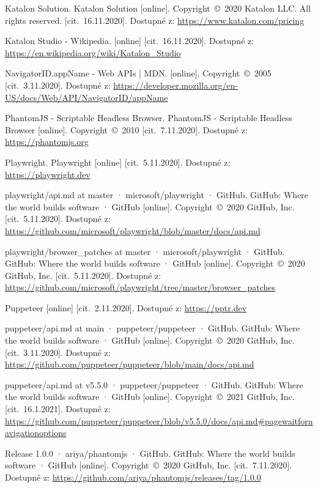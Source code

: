 \begin{thebibliography}{99}
 Katalon Solution. Katalon Solution [online]. Copyright~©~2020 Katalon LLC. All rights reserved. [cit.~16.11.2020]. Dostupné z: \url{https://www.katalon.com/pricing}

 Katalon Studio - Wikipedia. [online] [cit.~16.11.2020]. Dostupné z: \url{https://en.wikipedia.org/wiki/Katalon_Studio}

 NavigatorID.appName - Web APIs | MDN. [online]. Copyright~©~2005 [cit.~3.11.2020]. Dostupné z: \url{https://developer.mozilla.org/en-US/docs/Web/API/NavigatorID/appName}

 PhantomJS - Scriptable Headless Browser. PhantomJS - Scriptable Headless Browser [online]. Copyright~©~2010 [cit.~7.11.2020]. Dostupné z: \url{https://phantomjs.org}

 Playwright. Playwright [online] [cit.~5.11.2020]. Dostupné z: \url{https://playwright.dev}

 playwright/api.md at master · microsoft/playwright · GitHub. GitHub: Where the world builds software · GitHub [online]. Copyright~©~2020 GitHub, Inc. [cit.~5.11.2020]. Dostupné z: \url{https://github.com/microsoft/playwright/blob/master/docs/api.md}

 playwright/browser\_patches at master · microsoft/playwright · GitHub. GitHub: Where the world builds software · GitHub [online]. Copyright~©~2020 GitHub, Inc. [cit.~5.11.2020]. Dostupné z: \url{https://github.com/microsoft/playwright/tree/master/browser_patches}

 Puppeteer [online] [cit.~2.11.2020]. Dostupné z: \url{https://pptr.dev}

 puppeteer/api.md at main · puppeteer/puppeteer · GitHub. GitHub: Where the world builds software · GitHub [online]. Copyright~©~2020 GitHub, Inc. [cit.~3.11.2020]. Dostupné z: \url{https://github.com/puppeteer/puppeteer/blob/main/docs/api.md}

 puppeteer/api.md at v5.5.0 · puppeteer/puppeteer · GitHub. GitHub: Where the world builds software · GitHub [online]. Copyright~©~2021 GitHub, Inc. [cit.~16.1.2021]. Dostupné z: \url{https://github.com/puppeteer/puppeteer/blob/v5.5.0/docs/api.md#pagewaitfornavigationoptions}

 Release 1.0.0 · ariya/phantomjs · GitHub. GitHub: Where the world builds software · GitHub [online]. Copyright~©~2020 GitHub, Inc. [cit.~7.11.2020]. Dostupné z: \url{https://github.com/ariya/phantomjs/releases/tag/1.0.0}


\end{thebibliography}
